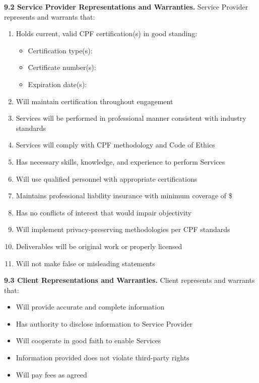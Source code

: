 \documentclass[11pt,a4paper]{article}
\begin{document}
\textbf{9.2 Service Provider Representations and Warranties.} Service Provider represents and warrants that:

\begin{enumerate}[label=\alph*)]
\item Holds current, valid CPF certification(s) in good standing:
\begin{itemize}
\item Certification type(s): \underline{\hspace{8cm}}
\item Certificate number(s): \underline{\hspace{8cm}}
\item Expiration date(s): \underline{\hspace{8cm}}
\end{itemize}
\item Will maintain certification throughout engagement
\item Services will be performed in professional manner consistent with industry standards
\item Services will comply with CPF methodology and Code of Ethics
\item Has necessary skills, knowledge, and experience to perform Services
\item Will use qualified personnel with appropriate certifications
\item Maintains professional liability insurance with minimum coverage of \$\underline{\hspace{4cm}}
\item Has no conflicts of interest that would impair objectivity
\item Will implement privacy-preserving methodologies per CPF standards
\item Deliverables will be original work or properly licensed
\item Will not make false or misleading statements
\end{enumerate}

\textbf{9.3 Client Representations and Warranties.} Client represents and warrants that:
\begin{itemize}
\item Will provide accurate and complete information
\item Has authority to disclose information to Service Provider
\item Will cooperate in good faith to enable Services
\item Information provided does not violate third-party rights
\item Will pay fees as agreed
\end{itemize}
\end{document}
